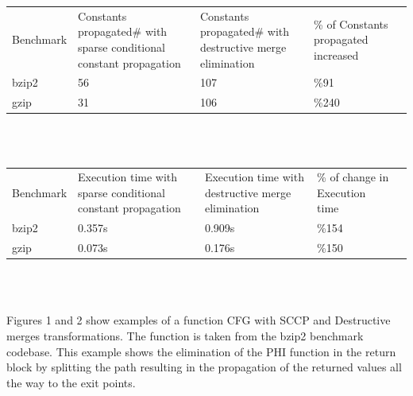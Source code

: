 \documentclass{article}
\begin{document}
\begin{adjustbox}{center}
\renewcommand{\arraystretch}{2}
\begin{tabular}{| C{3cm} | C{3cm} | C{3cm} | C{3cm} | C{3cm} |}
\hline
Benchmark & Constants propagated\# with sparse conditional constant propagation & Constants propagated\# with destructive merge elimination & \% of Constants propagated increased \\  
bzip2 & 56 & 107 & \%91  \\ 
gzip & 31 & 106 &  \%240 \\ 

\end{tabular}
\end{adjustbox}

~\\~
\begin{adjustbox}{center}
\renewcommand{\arraystretch}{2}
\begin{tabular}{| C{4cm} | C{3cm} | C{3cm} | C{3cm} | C{3cm} |}
\hline
Benchmark & Execution time with sparse conditional constant propagation & Execution time with destructive merge elimination & \% of change in Execution time \\  
bzip2 & 0.357s & 0.909s & \%154  \\ 
gzip  & 0.073s & 0.176s & \%150  \\ 
\end{tabular}
\end{adjustbox}

~\\~

Figures 1 and 2 show examples of a function CFG with SCCP and Destructive merges transformations. The function is taken from the bzip2 benchmark codebase. This example shows the elimination of the PHI function in the return block by splitting the path resulting in the propagation of the returned values all the way to the exit points. 
\end{document}
